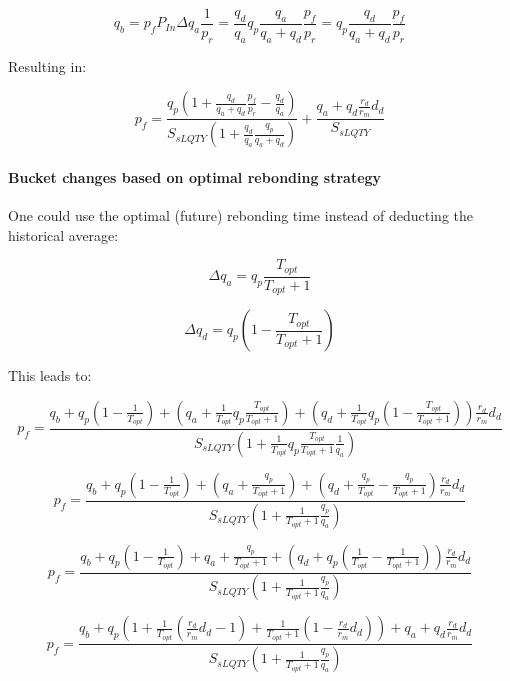 \documentclass{article}
\begin{document}
\begin{equation}
q_{b} = p_f P_{In} \Delta q_{a} \frac{1}{p_r} = \frac{q_{d}}{q_{a}} q_p \frac{q_{a}}{q_{a}+q_{d}} \frac{p_{f}}{p_{r}}  = q_p \frac{q_{d}}{q_{a}+q_{d}} \frac{p_{f}}{p_{r}}
\end{equation}

Resulting in:

\begin{equation}
p_{f} = \frac{q_{p} \left(1+\frac{q_{d}}{q_{a}+q_{d}} \frac{p_{f}}{p_{r}}-\frac{q_{d}}{q_{a}}\right)}{S_{sLQTY} \left( 1+\frac{q_{d}}{q_{a}}\frac{q_{p}}{q_{a}+q_{d}} \right)} + \frac{q_{a}+q_{d}\frac{r_{d}}{r_{m}}d_{d}}{S_{sLQTY}}
\end{equation}

\paragraph{Bucket changes based on optimal rebonding strategy}
One could use the optimal (future) rebonding time instead of deducting the historical average:

\begin{equation}
\Delta q_{a} = q_{p} \frac{T_{opt}}{T_{opt}+1}
\end{equation}

\begin{equation}
\Delta q_{d} = q_{p} \left( 1- \frac{T_{opt}}{T_{opt}+1} \right)
\end{equation}

This leads to:

\[
p_{f} = \frac{q_{b}+q_{p} \left(1-\frac{1}{T_{opt}}\right)+\left(q_{a}+\frac{1}{T_{opt}} q_{p} \frac{T_{opt}}{T_{opt}+1}\right)+ \left(q_{d}+\frac{1}{T_{opt}} q_{p} \left( 1- \frac{T_{opt}}{T_{opt}+1}\right)\right)\frac{r_{d}}{r_{m}}d_{d}}{S_{sLQTY} \left( 1+\frac{1}{T_{opt}} q_{p} \frac{T_{opt}}{T_{opt}+1}\frac{1}{q_{a}} \right)}
\]

\[
p_{f} = \frac{q_{b}+q_{p} \left(1-\frac{1}{T_{opt}}\right)+\left(q_{a}+ \frac{q_{p}}{T_{opt}+1}\right)+ \left(q_{d}+\frac{q_{p}}{T_{opt}} - \frac{q_{p}}{T_{opt}+1}\right)\frac{r_{d}}{r_{m}}d_{d}}{S_{sLQTY} \left( 1+ \frac{1}{T_{opt}+1}\frac{q_{p}}{q_{a}} \right)}
\]

\[
p_{f} = \frac{q_{b}+q_{p}\left(1-\frac{1}{T_{opt}}\right)+q_{a}+ \frac{q_{p}}{T_{opt}+1}+\left(q_{d}+q_{p} \left( \frac{1}{T_{opt}}- \frac{1}{T_{opt}+1} \right)\right)\frac{r_{d}}{r_{m}}d_{d}}{S_{sLQTY}\left(1+  \frac{1}{T_{opt}+1}\frac{q_{p}}{q_{a}}\right)}
\]

\begin{equation}
  \label{eq:recursive_optimal_1}
p_{f} = \frac{q_{b}+q_{p} \left(1+\frac{1}{T_{opt}}\left(\frac{r_{d}}{r_{m}}d_{d}-1\right)+ \frac{1}{T_{opt}+1}\left( 1 - \frac{r_{d}}{r_{m}}d_{d} \right)\right)+q_{a}+q_{d}\frac{r_{d}}{r_{m}}d_{d}}{S_{sLQTY}\left(1+  \frac{1}{T_{opt}+1}\frac{q_{p}}{q_{a}}\right)}
\end{equation}
\end{document}
